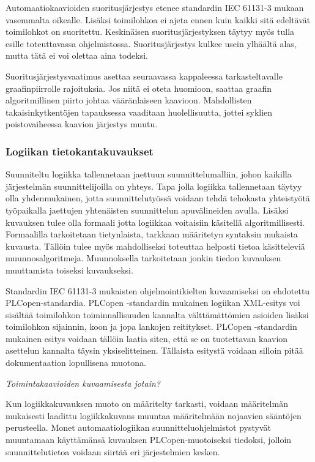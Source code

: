 \documentclass[finnish,12pt]{article}
\begin{document}
Automaatiokaavioiden suoritusjärjestys etenee standardin IEC 61131-3 mukaan
vasemmalta oikealle. Lisäksi toimilohkoa ei ajeta ennen kuin kaikki sitä edeltävät toimilohkot on suoritettu.
Keskinäisen suoritusjärjestyksen täytyy myös tulla esille toteuttavassa ohjelmistossa.
Suoritusjärjestys kulkee usein ylhäältä alas, mutta tätä ei voi olettaa aina todeksi.

Suoritusjärjestysvaatimus asettaa seuraavassa kappaleessa tarkasteltavalle graafinpiirrolle rajoituksia.
Jos niitä ei oteta huomioon, saattaa graafin algoritmillinen piirto johtaa vääränlaiseen kaavioon.
Mahdollisten takaisinkytkentöjen tapauksessa vaaditaan huolellisuutta, jottei syklien poistovaiheessa kaavion järjestys muutu.


		\subsubsection{Logiikan tietokantakuvaukset}

Suunniteltu logiikka tallennetaan jaettuun suunnittelumalliin, johon kaikilla järjestelmän suunnittelijoilla on yhteys.
Tapa jolla logiikka tallennetaan täytyy olla yhdenmukainen, jotta suunnittelutyössä voidaan tehdä tehokasta yhteistyötä työpaikalla jaettujen yhtenäisten suunnittelun apuvälineiden avulla.
Lisäksi kuvauksen tulee olla formaali jotta logiikkaa voitaisiin käsitellä algoritmillisesti.
Formaalilla tarkoitetaan tietynlaista, tarkkaan määritetyn syntaksin mukaista kuvausta.
Tällöin tulee myös mahdolliseksi toteuttaa helposti tietoa käsitteleviä muunnosalgoritmeja.
Muunnoksella tarkoitetaan jonkin tiedon kuvauksen muuttamista toiseksi kuvaukseksi.

Standardin IEC 61131-3 mukaisten ohjelmointikielten kuvaamiseksi on ehdotettu PLCopen-standardia.
PLCopen -standardin mukainen logiikan XML-esitys voi sisältää toimilohkon toiminnallisuuden kannalta välttämättömien asioiden lisäksi toimilohkon sijainnin, koon ja jopa lankojen reititykset.
PLCopen -standardin mukainen esitys voidaan tällöin laatia siten, että se on tuotettavan kaavion asettelun kannalta täysin yksiselitteinen.
Tällaista esitystä voidaan silloin pitää dokumentaation lopullisena muotona.

\emph{Toimintakaavioiden kuvaamisesta jotain?}

Kun logiikkakuvauksen muoto on määritelty tarkasti, voidaan määritelmän mukaisesti laadittu logiikkakuvaus muuntaa määritelmään nojaavien sääntöjen perusteella.
Monet automaatiologiikan suunnitteluohjelmistot pystyvät muuntamaan käyttämänsä kuvauksen PLCopen-muotoiseksi tiedoksi, jolloin suunnittelutietoa voidaan siirtää eri järjestelmien kesken.
\end{document}
